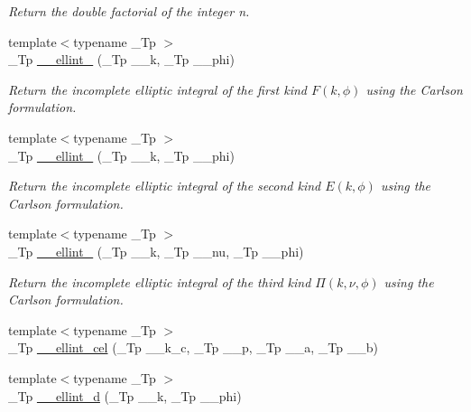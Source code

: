 \begin{DoxyCompactItemize}
\begin{DoxyCompactList}\small\item\em Return the double factorial of the integer n. \end{DoxyCompactList}\item 
{\footnotesize template$<$typename \+\_\+\+Tp $>$ }\\\+\_\+\+Tp \hyperlink{namespacestd_1_1____detail_aa349fe5bcf36d29cfacf6cd3e8aa65b0}{\+\_\+\+\_\+ellint\+\_} (\+\_\+\+Tp \+\_\+\+\_\+k, \+\_\+\+Tp \+\_\+\+\_\+phi)
\begin{DoxyCompactList}\small\item\em Return the incomplete elliptic integral of the first kind $ F(k,\phi) $ using the Carlson formulation. \end{DoxyCompactList}\item 
{\footnotesize template$<$typename \+\_\+\+Tp $>$ }\\\+\_\+\+Tp \hyperlink{namespacestd_1_1____detail_ad3687a38e74e5fbf08265501add0b56a}{\+\_\+\+\_\+ellint\+\_} (\+\_\+\+Tp \+\_\+\+\_\+k, \+\_\+\+Tp \+\_\+\+\_\+phi)
\begin{DoxyCompactList}\small\item\em Return the incomplete elliptic integral of the second kind $ E(k,\phi) $ using the Carlson formulation. \end{DoxyCompactList}\item 
{\footnotesize template$<$typename \+\_\+\+Tp $>$ }\\\+\_\+\+Tp \hyperlink{namespacestd_1_1____detail_a9c6ea96cd5d6907fce278010b992499a}{\+\_\+\+\_\+ellint\+\_} (\+\_\+\+Tp \+\_\+\+\_\+k, \+\_\+\+Tp \+\_\+\+\_\+nu, \+\_\+\+Tp \+\_\+\+\_\+phi)
\begin{DoxyCompactList}\small\item\em Return the incomplete elliptic integral of the third kind $ \Pi(k,\nu,\phi) $ using the Carlson formulation. \end{DoxyCompactList}\item 
{\footnotesize template$<$typename \+\_\+\+Tp $>$ }\\\+\_\+\+Tp \hyperlink{namespacestd_1_1____detail_a7c7d04715f0d40e054299312db35e32d}{\+\_\+\+\_\+ellint\+\_\+cel} (\+\_\+\+Tp \+\_\+\+\_\+k\+\_\+c, \+\_\+\+Tp \+\_\+\+\_\+p, \+\_\+\+Tp \+\_\+\+\_\+a, \+\_\+\+Tp \+\_\+\+\_\+b)
\item 
{\footnotesize template$<$typename \+\_\+\+Tp $>$ }\\\+\_\+\+Tp \hyperlink{namespacestd_1_1____detail_a00da42d89830fd51e9934fe0c5e08b7f}{\+\_\+\+\_\+ellint\+\_\+d} (\+\_\+\+Tp \+\_\+\+\_\+k, \+\_\+\+Tp \+\_\+\+\_\+phi)

\end{DoxyCompactItemize}
